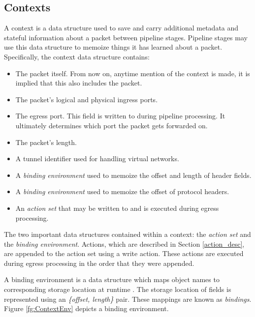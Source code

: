 \subsection{Contexts} \label{context_desc}

A context is a data structure used to save and carry
additional metadata and stateful information about a packet between pipeline stages.
Pipeline stages may use this data structure to memoize things it has learned
about a packet. Specifically, the context data structure contains:

\begin{itemize} 
\item The packet itself. From now on, anytime mention of the
context is made, it is implied that this also includes the packet. 

\item
The packet's logical and physical ingress ports. 

\item The egress port. This
field is written to during pipeline processing. It ultimately determines which
port the packet gets forwarded on. 

\item The packet's length. 

\item A tunnel identifier used for handling virtual networks.

\item A \emph{binding environment} used to memoize the offset
and length of header fields. 

\item A \emph{binding environment} used to memoize the offset
of protocol headers. 

\item An \emph{action set} that may be written to and is
executed during egress processing. 
\end{itemize}

The two important data structures contained within a context: 
the \emph{action set} and the \emph{binding environment}.
Actions, which are described in Section \ref{action_desc}, are appended
to the action set using a write action.
These actions are executed during egress processing in the 
order that they were appended.

A binding environment is a data structure which maps object names to
corresponding storage location at runtime \cite{compilers1}.
The storage location of fields is represented using an \emph{\{offset, length\}} pair.
These mappings are known as \emph{bindings}. Figure \ref{fg:ContextEnv} 
depicts a binding environment.

